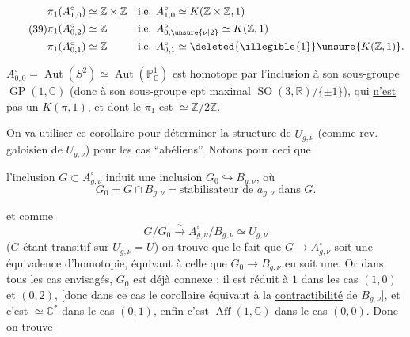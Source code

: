 \[
\tag{39}
\begin{aligned}
\pi_1(A_{1,0}^{\circ})&\simeq\mathbb Z\times\mathbb Z
&&\text{i.e. }A_{1,0}^{\circ}\simeq K(\mathbb Z\times\mathbb Z,1)\\
\pi_1(A_{0,2}^{\circ})&\simeq\mathbb Z
&&\text{i.e. }A_{0,\unsure{\nu|2}}^{\circ}\simeq K(\mathbb Z,1)\\
\pi_1(A_{0,1}^{\circ})&\simeq\mathbb Z
&&\text{i.e. }A_{0,1}^{\circ}\simeq\deleted{\illegible{1}}\unsure{K(\mathbb Z,1)}.
\end{aligned}
\]

$A_{0,0}^{\circ}=\operatorname{Aut}(S^2)\simeq\operatorname{Aut}(\mathbb P_{\mathbb C}^1)$ est homotope par l'inclusion à son sous-groupe $\operatorname{GP}(1,\mathbb C)$ (donc à son sous-groupe cpt maximal $\operatorname{SO}(3,\mathbb R)/\{\pm1\}$), qui \uline{n'est pas} un $K(\pi,1)$, et dont le $\pi_1$ est $\simeq\mathbb Z/2\mathbb Z$.

On va utiliser ce corollaire pour déterminer la structure de $\widetilde U_{g,\nu}$ (comme rev. galoisien de $U_{g,\nu}$) pour les cas ``abéliens''. Notons pour ceci que


l'inclusion $G\subset A_{g,\nu}^{\circ}$ induit une inclusion $G_0\hookrightarrow B_{g,\nu}$, où 
\[
\tag{40}
G_0=G\cap B_{g,\nu}=\text{stabilisateur de }a_{g,\nu}\text{ dans }G.
\]

et comme
\[
G/G_0\xrightarrow{\sim}A_{g,\nu}^{\circ}/B_{g,\nu}\simeq U_{g,\nu}
\]
($G$ étant transitif sur $U_{g,\nu}=U$) on trouve que le fait que $G\longrightarrow A_{g,\nu}^{\circ}$ soit une équivalence d'homotopie, équivaut à celle que $G_0\longrightarrow B_{g,\nu}$ en soit une. Or dans tous les cas envisagés, $G_0$ est déjà connexe : il est réduit à $1$ dans les cas $(1,0)$ et $(0,2)$, [donc dans ce cas le corollaire équivaut à la \uline{contractibilité} de $B_{g,\nu}$], et c'est $\simeq\mathbb C^*$ dans le cas $(0,1)$, enfin c'est $\operatorname{Aff}(1,\mathbb C)$ dans le cas $(0,0)$. Donc on trouve

